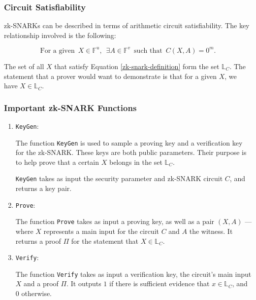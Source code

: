 \documentclass{article}
\begin{document}
\subsubsection{Circuit Satisfiability}
zk-SNARKs can be described in terms of arithmetic circuit satisfiability. The key relationship involved is the following:

\begin{equation}
\text{For a given} \,\,\, X \in \mathbb{F}^u, \,\,\, \exists A \in \mathbb{F}^v \,\,\, \text{such that} \,\,\, C(X, A) = 0^{m}.
\label{zk-snark-definition}
\end{equation}
\newline

The set of all $X$ that satisfy Equation \ref{zk-snark-definition} form the set $\mathbb{L}_C$. The statement that a prover would want to demonstrate is that for a given $X$, we have $X \in \mathbb{L}_C$.

\subsubsection{Important zk-SNARK Functions}

\begin{enumerate}

\item {\texttt{KeyGen}}:

The function \texttt{KeyGen} is used to sample a proving key and a verification key for the zk-SNARK. These keys are both public parameters. Their purpose is to help prove that a certain $X$ belongs in the set $\mathbb{L}_C$.

\texttt{KeyGen} takes as input the security parameter and zk-SNARK circuit $C$, and returns a key pair.

\item {\texttt{Prove}}:

The function \texttt{Prove} takes as input a proving key, as well as a pair $(X, A)$ --- where $X$ represents a main input for the circuit $C$ and $A$ the witness. It returns a proof $\Pi$ for the statement that $X \in \mathbb{L}_C$.

\item {\texttt{Verify}}:

The function \texttt{Verify} takes as input a verification key, the circuit's main input $X$ and a proof $\Pi$. It outputs $1$ if there is sufficient evidence that $x \in \mathbb{L}_C$, and 0 otherwise.

\end{enumerate}
\end{document}
